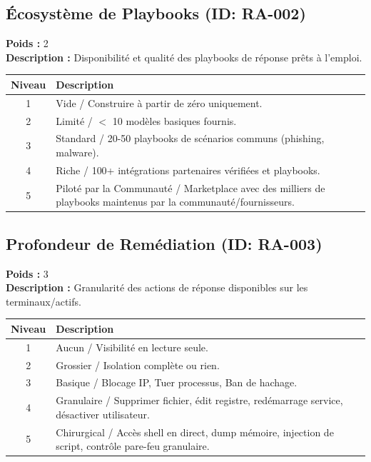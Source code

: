 \documentclass{article}
\begin{document}
\subsection{Écosystème de Playbooks (ID: RA-002)}
\textbf{Poids :} 2 \\
\textbf{Description :} Disponibilité et qualité des playbooks de réponse prêts à l'emploi.
\vspace{0.3cm}
\begin{longtable}{|c|p{12cm}|}
\hline
\rowcolor{lightgray} \textbf{Niveau} & \textbf{Description} \\ \hline
1 & Vide / Construire à partir de zéro uniquement. \\ \hline
2 & Limité / $<$ 10 modèles basiques fournis. \\ \hline
3 & Standard / 20-50 playbooks de scénarios communs (phishing, malware). \\ \hline
4 & Riche / 100+ intégrations partenaires vérifiées et playbooks. \\ \hline
5 & Piloté par la Communauté / Marketplace avec des milliers de playbooks maintenus par la communauté/fournisseurs. \\ \hline
\end{longtable}
\vspace{0.5cm}
\subsection{Profondeur de Remédiation (ID: RA-003)}
\textbf{Poids :} 3 \\
\textbf{Description :} Granularité des actions de réponse disponibles sur les terminaux/actifs.
\vspace{0.3cm}
\begin{longtable}{|c|p{12cm}|}
\hline
\rowcolor{lightgray} \textbf{Niveau} & \textbf{Description} \\ \hline
1 & Aucun / Visibilité en lecture seule. \\ \hline
2 & Grossier / Isolation complète ou rien. \\ \hline
3 & Basique / Blocage IP, Tuer processus, Ban de hachage. \\ \hline
4 & Granulaire / Supprimer fichier, édit registre, redémarrage service, désactiver utilisateur. \\ \hline
5 & Chirurgical / Accès shell en direct, dump mémoire, injection de script, contrôle pare-feu granulaire. \\ \hline
\end{longtable}
\vspace{0.5cm}
\end{document}
